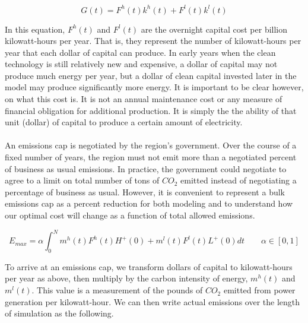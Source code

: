 \documentclass{easychithesis}
\begin{document}
\begin{equation}\label{eq:simpleGenConstraint}
G(t) = F^h(t) k^h(t) + F^l(t) k^l(t)
\end{equation}

In this equation, $F^h (t)$ and $F^l (t)$ are the overnight capital cost per billion kilowatt-hours per year. That is, they represent the number of kilowatt-hours per year that each dollar of capital can produce. In early years when the clean technology is still relatively new and expensive, a dollar of capital may not produce much energy per year, but a dollar of clean capital invested later in the model may produce significantly more energy. It is important to be clear however, on what this cost is. It is not an annual maintenance cost or any measure of financial obligation for additional production. It is simply the the ability of that unit (dollar) of capital to produce a certain amount of electricity. 



\paragraph{} An emissions cap is negotiated by the region's government. Over the course of a fixed number of years, the region must not emit more than a negotiated percent of business as usual emissions. In practice, the government could negotiate to agree to a limit on total number of tons of $CO_2$ emitted instead of negotiating a percentage of business as usual. However, it is convenient to represent a bulk emissions cap as a percent reduction for both modeling and to understand how our optimal cost will change as a function of total allowed emissions.

\begin{equation}\label{eq:simpleMaxEmission}
E_{max} = \alpha \int_0^N m^h(t) F^h(t) H^+(0) + m^l(t) F^l(t) L^+(0) dt \qquad \alpha \in [0,1]
\end{equation}

To arrive at an emissions cap, we transform dollars of capital to kilowatt-hours per year as above, then multiply by the carbon intensity of energy, $m^h(t)$ and $m^l(t)$. This value is a measurement of the pounds of $CO_2$ emitted from power generation per kilowatt-hour. We can then write actual emissions over the length of simulation as the following. 
\end{document}
